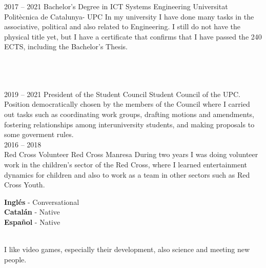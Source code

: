 \documentclass[9pt]{developercv} %
\begin{document}


\begin{entrylist}
	\entry
		{2017 -- 2021}
		{Bachelor's Degree in ICT Systems Engineering}
		{Universitat Politècnica de Catalunya- UPC}
		{In my university I have done many tasks in the associative, political and also related to Engineering. I still do not have the physical title yet, but I have a certificate that confirms that I have passed the 240 ECTS, including the Bachelor's Thesis.\\ 
		\\ \\ \\}
\end{entrylist}




\begin{entrylist}
	\entry
	{2019 -- 2021}
	{President of the Student Council}
	{Student Council of the UPC.}
	{Position democratically chosen by the members of the Council where I carried out tasks such as coordinating work groups, drafting motions and amendments, fostering relationships among interuniversity students, and making proposals to some goverment rules.\\
	}
	\entry
	{2016 -- 2018\\}
	{Red Cross Volunteer}
	{Red Cross Manresa}
	{During two years I was doing volunteer work in the children's sector of the Red Cross, where I learned entertainment dynamics for children and also to work as a team in other sectors such as Red Cross Youth.\\
	}
\end{entrylist}


\begin{minipage}[t]{0.3\textwidth}
	\vspace{-\baselineskip} %

	
	\textbf{Inglés} - Conversational\\
	\textbf{Catalán} - Native\\
	\textbf{Español} - Native
\end{minipage}
\hfill
\begin{minipage}[t]{0.3\textwidth}
	\vspace{-\baselineskip} %
	
	\\
	I like video games, especially their development, also science and meeting new people.
	
\end{minipage}
\hfill

\end{document}

